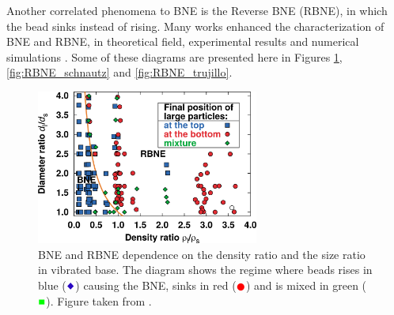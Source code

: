     Another correlated phenomena to BNE is the Reverse BNE (RBNE), in which the bead sinks instead of rising. Many works enhanced the characterization of BNE and RBNE, in theoretical field, experimental results and numerical simulations \cite{A_Horizontal_Brazil-Nut_Effect_and_Its_Reverse, Brazil-nut_effect_versus_reverse_Brazil-nut_effect_in_a_moderately_dense_granular_fluid, Categorization_of_Brazil_nut_and_its_reverse_under_less-convective_conditions_for_microgravity_geology, Competition_of_Brazil_nut_effect_buoyancy_and_inelasticity_induced_segregation_in_a_granular_mixture, Reverse_Brazil_Nut_Problem_Competition_between_Percolation_and_Condensation, Reverse_buoyancy_in_a_vibrated_granular_bed_Computer_Simulations, Reversing_the_Brazil-Nut_Effect_Competition_between_Percolation_and_Condensation, Segregation_in_a_fluidized_binary_granular_mixture_Competition_between_buoyancy_and_geometric_forces, Simple_model_for_reverse_buoyancy_in_a_vibrated_granular_system, Hydrodynamic_theory_for_reverse_brazil_nut_segregation_and_the_non-monotonic_ascension_dynamics}. Some of these diagrams are presented here in Figures \ref{fig:RBNE_breu}, \ref{fig:RBNE_schnautz} and \ref{fig:RBNE_trujillo}.

\begin{figure}[H]
    \centering
    \includegraphics[width=0.65\textwidth]{04-figuras/BNE_Breu.png}
    \caption[Phase diagram of BNE/RBNE from experiment: density ratio and size ratio.]{BNE and RBNE dependence on the density ratio and the size ratio in vibrated base. The diagram shows the regime where beads rises in blue ($\textcolor{blue}{\Diamondblack}$) causing the BNE, sinks in red ($\textcolor{red}{\CIRCLE}$) and is mixed in green ($\textcolor{green}{\blacksquare}$). Figure taken from \cite{Reversing_the_Brazil-Nut_Effect_Competition_between_Percolation_and_Condensation}.}
    \label{fig:RBNE_breu}
\end{figure}

